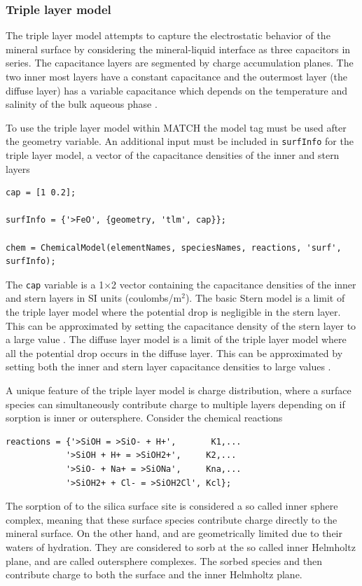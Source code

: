\documentclass{article}
\begin{document}
\subsubsection{Triple layer model}
The triple layer model attempts to capture the electrostatic behavior of the mineral surface by considering the mineral-liquid interface as three capacitors in series. The capacitance layers are segmented by charge accumulation planes. The two inner most layers have a constant capacitance and the outermost layer (the diffuse layer) has a variable capacitance which depends on the temperature and salinity of the bulk aqueous phase \cite{McNeece2016, westall1980, Hiemstra1989a}{}.

To use the triple layer model within MATCH the model tag  must be used after the geometry variable. An additional input must be included in \verb|surfInfo| for the triple layer model, a vector of the capacitance densities of the inner and stern layers

\begin{lstlisting}
cap = [1 0.2];

surfInfo = {'>FeO', {geometry, 'tlm', cap}};

chem = ChemicalModel(elementNames, speciesNames, reactions, 'surf', surfInfo);
\end{lstlisting}
The \verb|cap| variable is a 1$\times$2 vector containing the capacitance densities of the inner and stern layers in SI units (coulombs/m$^2$). The basic Stern model is a limit of the triple layer model where the potential drop is negligible in the stern layer. This can be approximated by setting the capacitance density of the stern layer to a large value . The diffuse layer model is a limit of the triple layer model where all the potential drop occurs in the diffuse layer. This can be approximated by setting both the inner and stern layer capacitance densities to large values .

A unique feature of the triple layer model is charge distribution, where a surface species can simultaneously contribute charge to multiple layers depending on if sorption is inner or outersphere. Consider the chemical reactions

\begin{lstlisting}
reactions = {'>SiOH = >SiO- + H+',       K1,...
            '>SiOH + H+ = >SiOH2+',     K2,...
            '>SiO- + Na+ = >SiONa',     Kna,...
            '>SiOH2+ + Cl- = >SiOH2Cl', Kcl};
\end{lstlisting}
The sorption of  to the silica surface site is considered a so called inner sphere complex, meaning that these surface species contribute charge directly to the mineral surface. On the other hand,  and  are geometrically limited due to their waters of hydration. They are considered to sorb at the so called inner Helmholtz plane, and are called outersphere complexes. The sorbed species  and  then contribute charge to both the surface and the inner Helmholtz plane.
\end{document}
